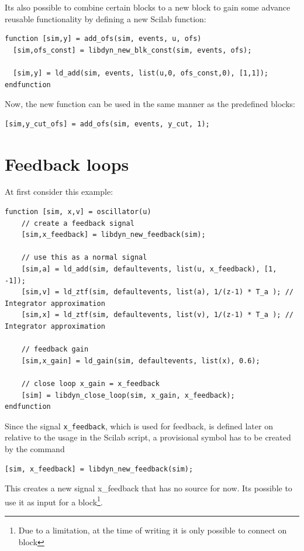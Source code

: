 \documentclass[%
	pdftex,%
	a4paper,%
	oneside,%
	11pt,%
	halfparskip,%
	headsepline,%
	bibtotocnumbered,%
	idxtotoc%
]{scrartcl}
\begin{document}
Its also possible to combine certain blocks to a new block to gain some advance reusable functionality by defining a new Scilab function:

\begin{verbatim}
function [sim,y] = add_ofs(sim, events, u, ofs)
  [sim,ofs_const] = libdyn_new_blk_const(sim, events, ofs);
  
  [sim,y] = ld_add(sim, events, list(u,0, ofs_const,0), [1,1]);
endfunction
\end{verbatim}

Now, the new function can be used in the same manner as the predefined blocks:

\begin{verbatim}
[sim,y_cut_ofs] = add_ofs(sim, events, y_cut, 1);
\end{verbatim}

\section{Feedback loops}

At first consider this example:

\begin{verbatim}
function [sim, x,v] = oscillator(u)
    // create a feedback signal
    [sim,x_feedback] = libdyn_new_feedback(sim);

    // use this as a normal signal
    [sim,a] = ld_add(sim, defaultevents, list(u, x_feedback), [1, -1]);
    [sim,v] = ld_ztf(sim, defaultevents, list(a), 1/(z-1) * T_a ); // Integrator approximation
    [sim,x] = ld_ztf(sim, defaultevents, list(v), 1/(z-1) * T_a ); // Integrator approximation  
    
    // feedback gain
    [sim,x_gain] = ld_gain(sim, defaultevents, list(x), 0.6);
    
    // close loop x_gain = x_feedback
    [sim] = libdyn_close_loop(sim, x_gain, x_feedback);
endfunction
\end{verbatim}

Since the signal \texttt{x\_feedback}, which is used for feedback, is defined later on relative to the usage in the Scilab script, a provisional symbol has to be created by the command

\begin{verbatim}
[sim, x_feedback] = libdyn_new_feedback(sim);
\end{verbatim}

This creates a new signal x\_feedback that has no source for now. Its possible to use it as input for a block\footnote{Due to a limitation, at the time of writing it is only possible to connect on block}.
\end{document}
